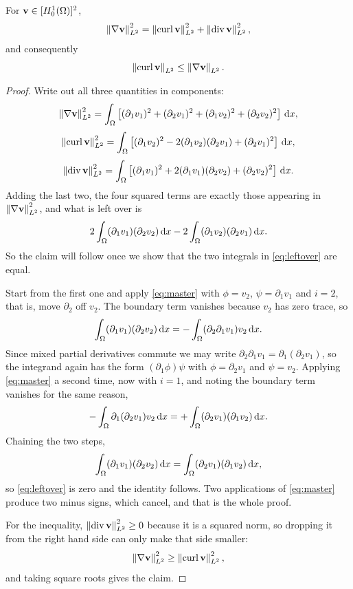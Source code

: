 \documentclass[11pt,a4paper]{article}
\begin{document}
\begin{lemma}\label{lem:curldiv}
For $\mathbf{v} \in [H^{1}_{0}(\Omega)]^{2}$,
\[
  \left\lVert \nabla \mathbf{v} \right\rVert_{L^{2}}^{2} = \left\lVert \operatorname{curl} \mathbf{v} \right\rVert_{L^{2}}^{2} + \left\lVert \operatorname{div} \mathbf{v} \right\rVert_{L^{2}}^{2} ,
\]
and consequently
\[
  \left\lVert \operatorname{curl} \mathbf{v} \right\rVert_{L^{2}} \le \left\lVert \nabla \mathbf{v} \right\rVert_{L^{2}} .
\]
\end{lemma}

\begin{proof}
Write out all three quantities in components:
\[
  \left\lVert \nabla \mathbf{v} \right\rVert_{L^{2}}^{2}
  = \int_\Omega \left[ (\partial_{1}v_{1})^{2} + (\partial_{2}v_{1})^{2}
  + (\partial_{1}v_{2})^{2} + (\partial_{2}v_{2})^{2} \right] \,\mathrm{d}x ,
\]
\[
  \left\lVert \operatorname{curl} \mathbf{v} \right\rVert_{L^{2}}^{2}
  = \int_\Omega \left[ (\partial_{1}v_{2})^{2}
  - 2(\partial_{1}v_{2})(\partial_{2}v_{1}) + (\partial_{2}v_{1})^{2} \right] \,\mathrm{d}x ,
\]
\[
  \left\lVert \operatorname{div} \mathbf{v} \right\rVert_{L^{2}}^{2}
  = \int_\Omega \left[ (\partial_{1}v_{1})^{2}
  + 2(\partial_{1}v_{1})(\partial_{2}v_{2}) + (\partial_{2}v_{2})^{2} \right] \,\mathrm{d}x .
\]
Adding the last two, the four squared terms are exactly those appearing in
$\left\lVert \nabla \mathbf{v} \right\rVert_{L^{2}}^{2}$, and what is left over is
\begin{equation}\label{eq:leftover}
  2\int_\Omega (\partial_{1}v_{1})(\partial_{2}v_{2}) \,\mathrm{d}x
  - 2\int_\Omega (\partial_{1}v_{2})(\partial_{2}v_{1}) \,\mathrm{d}x .
\end{equation}
So the claim will follow once we show that the two integrals in
\eqref{eq:leftover} are equal.

Start from the first one and apply \eqref{eq:master} with $\phi = v_{2}$,
$\psi = \partial_{1}v_{1}$ and $i = 2$, that is, move $\partial_{2}$ off
$v_{2}$. The boundary term vanishes because $v_{2}$ has zero trace, so
\[
  \int_\Omega (\partial_{1}v_{1})(\partial_{2}v_{2}) \,\mathrm{d}x
  = - \int_\Omega (\partial_{2}\partial_{1}v_{1}) v_{2} \,\mathrm{d}x .
\]
Since mixed partial derivatives commute we may write
$\partial_{2}\partial_{1}v_{1} = \partial_{1}(\partial_{2}v_{1})$, so the
integrand again has the form $(\partial_{1}\phi)\psi$ with
$\phi = \partial_{2}v_{1}$ and $\psi = v_{2}$. Applying \eqref{eq:master} a
second time, now with $i = 1$, and noting the boundary term vanishes for the
same reason,
\[
  - \int_\Omega \partial_{1}(\partial_{2}v_{1}) v_{2} \,\mathrm{d}x
  = + \int_\Omega (\partial_{2}v_{1})(\partial_{1}v_{2}) \,\mathrm{d}x .
\]
Chaining the two steps,
\[
  \int_\Omega (\partial_{1}v_{1})(\partial_{2}v_{2}) \,\mathrm{d}x
  = \int_\Omega (\partial_{2}v_{1})(\partial_{1}v_{2}) \,\mathrm{d}x ,
\]
so \eqref{eq:leftover} is zero and the identity follows. Two applications of
\eqref{eq:master} produce two minus signs, which cancel, and that is the whole
proof.

For the inequality, $\left\lVert \operatorname{div} \mathbf{v} \right\rVert_{L^{2}}^{2} \ge 0$ because it is a squared norm,
so dropping it from the right hand side can only make that side smaller:
\[
  \left\lVert \nabla \mathbf{v} \right\rVert_{L^{2}}^{2} \ge \left\lVert \operatorname{curl} \mathbf{v} \right\rVert_{L^{2}}^{2} ,
\]
and taking square roots gives the claim.
\end{proof}
\end{document}
